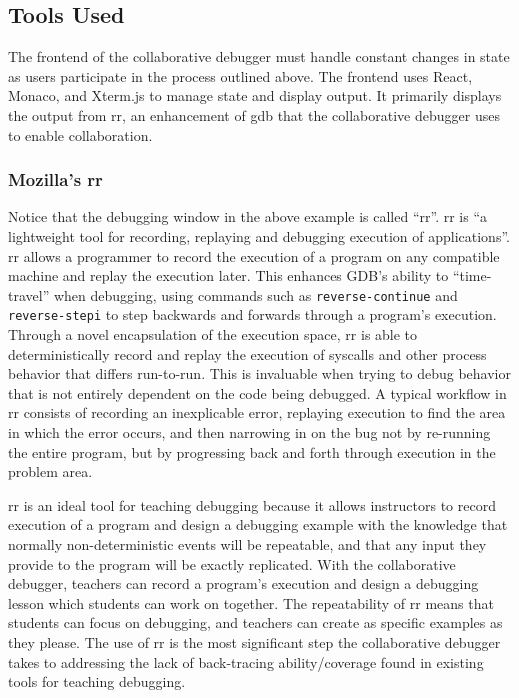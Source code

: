 \documentclass[12pt]{article}
\begin{document}
\subsection{Tools Used}

The frontend of the collaborative debugger must handle constant
changes in state as users participate in the process outlined above.
The frontend uses React, Monaco, and Xterm.js to manage state and
display output.  It primarily displays the output from rr, an
enhancement of gdb that the collaborative debugger uses to enable
collaboration.

\subsubsection{Mozilla's rr}\label{rr}

Notice that the debugging window in the above example is called
``rr''. rr is ``a lightweight tool for recording, replaying and
debugging execution of applications''\cite{rr-repo}. rr allows a
programmer to record the execution of a program on any compatible
machine and replay the execution later.  This enhances GDB's ability
to ``time-travel'' when debugging, using commands such as
\lstinline{reverse-continue} and
\lstinline{reverse-stepi}\cite{gdbman} to step backwards and forwards
through a program's execution.  Through a novel encapsulation of the
execution space, rr is able to deterministically record and replay the
execution of syscalls and other process behavior that differs
run-to-run.  This is invaluable when trying to debug behavior that is
not entirely dependent on the code being debugged.  A typical workflow
in rr consists of recording an inexplicable error, replaying execution
to find the area in which the error occurs, and then narrowing in on
the bug not by re-running the entire program, but by progressing back
and forth through execution in the problem area.
\par

rr is an ideal tool for teaching debugging because it allows
instructors to record execution of a program and design a debugging
example with the knowledge that normally non-deterministic events will
be repeatable, and that any input they provide to the program will be
exactly replicated.  With the collaborative debugger, teachers can
record a program's execution and design a debugging lesson which
students can work on together.  The repeatability of rr means that
students can focus on debugging, and teachers can create as specific
examples as they please.  The use of rr is the most significant step
the collaborative debugger takes to addressing the lack of
back-tracing ability/coverage found in existing tools for teaching
debugging\cite{10.1145/3286960.3286970}.
\end{document}
